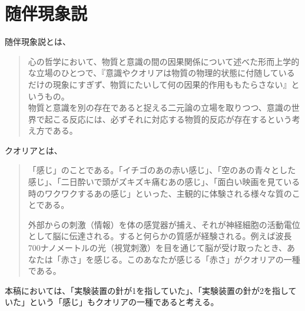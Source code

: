 \section{随伴現象説}
随伴現象説とは、
\begin{quotation}
心の哲学において、物質と意識の間の因果関係について述べた形而上学的な立場のひとつで、『意識やクオリアは物質の物理的状態に付随しているだけの現象にすぎず、物質にたいして何の因果的作用ももたらさない』というもの。\\物質と意識を別の存在であると捉える二元論の立場を取りつつ、意識の世界で起こる反応には、必ずそれに対応する物質的反応が存在するという考え方である。\cite{wikipedia}
\end{quotation}
クオリアとは、
\begin{quotation}
「感じ」のことである。「イチゴのあの赤い感じ」、「空のあの青々とした感じ」、「二日酔いで頭がズキズキ痛むあの感じ」、「面白い映画を見ている時のワクワクするあの感じ」といった、主観的に体験される様々な質のことである。\par
外部からの刺激（情報）を体の感覚器が捕え、それが神経細胞の活動電位として脳に伝達される。すると何らかの質感が経験される。例えば波長700ナノメートルの光（視覚刺激）を目を通じて脳が受け取ったとき、あなたは「赤さ」を感じる。このあなたが感じる「赤さ」がクオリアの一種である。\cite{wikipediaa}
\end{quotation}
本稿においては、「実験装置の針が1を指していた」、「実験装置の針が2を指していた」という「感じ」もクオリアの一種であると考える。